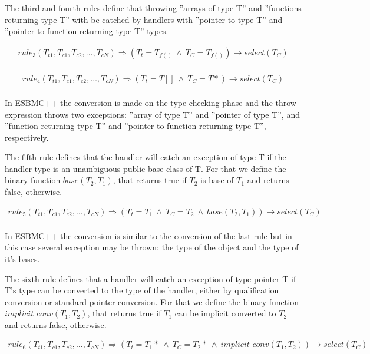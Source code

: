 \documentclass[a4paper]{llncs}
\begin{document}
The third and fourth rules define that throwing ''arrays of type T'' and
''functions returning type T'' with be catched by handlers with
''pointer to type T'' and ''pointer to function returning type T'' types.

\[\begin{array}{ll}
rule_3(T_{t1},T_{c1}, T_{c2}, \ldots, T_{cN}) \Longrightarrow
  (T_{t} = T_{f()} \: \wedge \: T_{C} = T_{f()})\rightarrow select(T_{C}) \\
\end{array}\]

\[\begin{array}{ll}
rule_4(T_{t1},T_{c1}, T_{c2}, \ldots, T_{cN}) \Longrightarrow
  (T_{t} = T[] \: \wedge \: T_{C} = T*)\rightarrow select(T_{C}) \\
\end{array}\]

In ESBMC++ the conversion is made on the type-checking phase and the throw
expression throws two exceptions: ''array of type T'' and ''pointer of type
T'', and ''function returning type T'' and ''pointer to function returning
type T'', respectively.

The fifth rule defines that the handler will catch an exception of type T
if the handler type is an unambiguous public base class of T.
For that we define the binary function $base(T_{2}, T_{1})$, that returns
true if $T_{2}$ is base of $T_{1}$ and returns false, otherwise.

\[\begin{array}{ll}
rule_5(T_{t1},T_{c1}, T_{c2}, \ldots, T_{cN}) \Longrightarrow
  (T_{t} = T_{1} \: \wedge \: T_{C} = T_{2} \: \wedge \: base(T_{2}, T_{1}))\rightarrow select(T_{C}) \\
\end{array}\]

In ESBMC++ the conversion is similar to the conversion of the last rule
but in this case several exception may be thrown: the type of the object
and the type of it's bases.

The sixth rule defines that a handler will catch an exception of type
pointer T if T's type can be converted to the type of the handler, either by
qualification conversion or standard pointer conversion.
For that we define the binary function $implicit\_conv(T_{1}, T_{2})$, that
returns true if $T_{1}$ can be implicit converted to $T_{2}$ and returns false,
otherwise.

\[\begin{array}{ll}
rule_6(T_{t1},T_{c1}, T_{c2}, \ldots, T_{cN}) \Longrightarrow
  (T_{t} = T_{1}* \: \wedge \: T_{C} = T_{2}* \: \wedge \: implicit\_conv(T_{1}, T_{2}))\rightarrow select(T_{C}) \\
\end{array}\]
\end{document}
